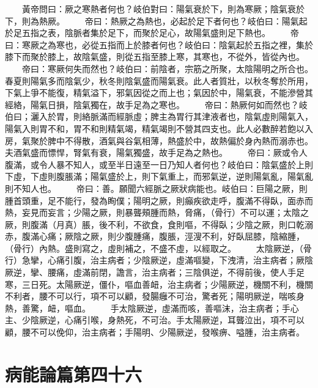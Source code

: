 　　黃帝問曰：厥之寒熱者何也？岐伯對曰：陽氣衰於下，則為寒厥；陰氣衰於下，則為熱厥。
　　帝曰：熱厥之為熱也，必起於足下者何也？岐伯曰：陽氣起於足五指之表，陰脈者集於足下，而聚於足心，故陽氣盛則足下熱也。
　　帝曰：寒厥之為寒也，必從五指而上於膝者何也？岐伯曰：陰氣起於五指之裡，集於膝下而聚於膝上，故陰氣盛，則從五指至膝上寒，其寒也，不從外，皆從內也。
　　帝曰：寒厥何失而然也？岐伯曰：前陰者，宗筋之所聚，太陰陽明之所合也。春夏則陽氣多而陰氣少，秋冬則陰氣盛而陽氣衰。此人者質壯，以秋冬奪於所用，下氣上爭不能復，精氣溢下，邪氣因從之而上也；氣因於中，陽氣衰，不能滲營其經絡，陽氣日損，陰氣獨在，故手足為之寒也。
　　帝曰：熱厥何如而然也？岐伯曰；灑入於胃，則絡脈滿而經脈虛；脾主為胃行其津液者也，陰氣虛則陽氣入，陽氣入則胃不和，胃不和則精氣竭，精氣竭則不營其四支也。此人必數醉若飽以入房，氣聚於脾中不得散，酒氣與谷氣相薄，熱盛於中，故熱偏於身內熱而溺赤也。夫酒氣盛而慓悍，腎氣有衰，陽氣獨盛，故手足為之熱也。
　　帝曰：厥或令人腹滿，或令人暴不知人，或至半日遠至一日乃知人者何也？岐伯曰：陰氣盛於上則下虛，下虛則腹脹滿；陽氣盛於上，則下氣重上，而邪氣逆，逆則陽氣亂，陽氣亂則不知人也。
　　帝曰：善。願聞六經脈之厥狀病能也。岐伯曰：巨陽之厥，則腫首頭重，足不能行，發為眴僕；陽明之厥，則癲疾欲走呼，腹滿不得臥，面赤而熱，妄見而妄言；少陽之厥，則暴聾頰腫而熱，脅痛，（骨行）不可以運；太陰之厥，則腹滿（月真）脹，後不利，不欲食，食則嘔，不得臥；少陰之厥，則口乾溺赤，腹滿心痛；厥陰之厥，則少腹腫痛，腹脹，涇溲不利，好臥屈膝，陰縮腫，（骨行）內熱。盛則寫之，虛則補之，不盛不虛，以經取之。
　　太陰厥逆，（骨行）急攣，心痛引腹，治主病者；少陰厥逆，虛滿嘔變，下洩清，治主病者；厥陰厥逆，攣、腰痛，虛滿前閉，譫言，治主病者；三陰俱逆，不得前後，使人手足寒，三日死。太陽厥逆，僵仆，嘔血善衄，治主病者；少陽厥逆，機關不利，機關不利者，腰不可以行，項不可以顧，發腸癰不可治，驚者死；陽明厥逆，喘咳身熱，善驚，衄，嘔血。
　　手太陰厥逆，虛滿而咳，善嘔沫，治主病者；手心主、少陰厥逆，心痛引喉，身熱死，不可治。手太陽厥逆，耳聾泣出，項不可以顧，腰不可以俛仰，治主病者；手陽明、少陽厥逆，發喉痹、嗌腫，治主病者。

\section{病能論篇第四十六}


